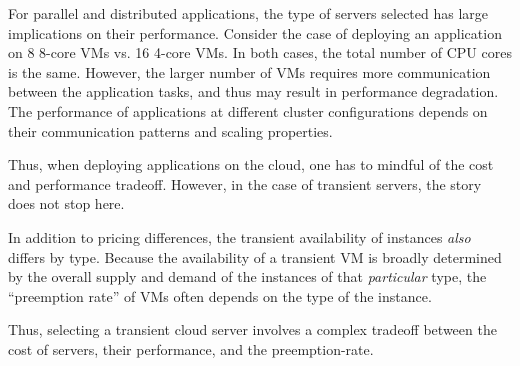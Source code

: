 For parallel and distributed applications, the type of servers selected has large implications on their performance.
Consider the case of deploying an application on 8 8-core VMs vs. 16 4-core VMs.
In both cases, the total number of CPU cores is the same.
However, the larger number of VMs requires more communication between the application tasks, and thus may result in performance degradation.
The performance of applications at different cluster configurations depends on their communication patterns and scaling properties. 



Thus, when deploying applications on the cloud, one has to mindful of the cost and performance tradeoff.
However, in the case of transient servers, the story does not stop here. 


In addition to pricing differences, the transient availability of instances \emph{also} differs by type.
Because the availability of a transient VM is broadly determined by the overall supply and demand of the instances of that \emph{particular} type, the ``preemption rate'' of VMs often depends on the type of the instance.



Thus, selecting a transient cloud server involves a complex tradeoff between the cost of servers, their performance, and the preemption-rate.







